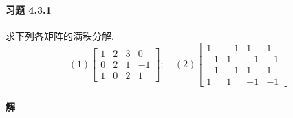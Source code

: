 \documentclass[12pt, a4paper, oneside, fontset=none]{ctexart}
\begin{document}
\paragraph*{习题 4.3.1} 求下列各矩阵的满秩分解.
$$
    (1) \begin{bmatrix}
        1 & 2 & 3 & 0  \\
        0 & 2 & 1 & -1 \\
        1 & 0 & 2 & 1
    \end{bmatrix};\quad (2) \begin{bmatrix}
        1  & -1 & 1  & 1  \\
        -1 & 1  & -1 & -1 \\
        -1 & -1 & 1  & 1  \\
        1  & 1  & -1 & -1
    \end{bmatrix}
$$

\paragraph*{解}
\end{document}
